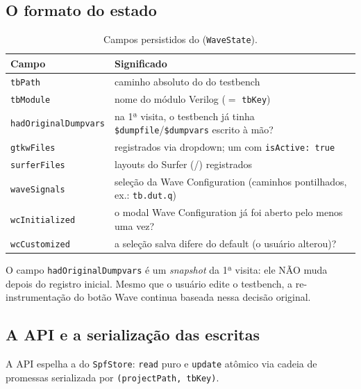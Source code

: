 \subsection{O formato do estado}

\begin{table}[h]
\centering
\begin{tabularx}{\linewidth}{Y Z}
\toprule
\textbf{Campo} & \textbf{Significado} \\
\midrule
\lstinline|tbPath| & caminho absoluto do  do testbench \\
\lstinline|tbModule| & nome do módulo Verilog ($=$ \lstinline|tbKey|) \\
\lstinline|hadOriginalDumpvars| & na 1ª visita, o testbench já tinha \lstinline|$dumpfile|/\lstinline|$dumpvars| escrito à mão? \\
\lstinline|gtkwFiles| &  registrados via dropdown; um com \lstinline|isActive: true| \\
\lstinline|surferFiles| & layouts do Surfer (/) registrados \\
\lstinline|waveSignals| & seleção da Wave Configuration (caminhos pontilhados, ex.: \lstinline|tb.dut.q|) \\
\lstinline|wcInitialized| & o modal Wave Configuration já foi aberto pelo menos uma vez? \\
\lstinline|wcCustomized| & a seleção salva difere do default (o usuário alterou)? \\
\bottomrule
\end{tabularx}
\caption{Campos persistidos do  (\lstinline|WaveState|).}
\label{tab:09-wavestore}
\end{table}

O campo \lstinline|hadOriginalDumpvars| é um \emph{snapshot} da 1ª visita: ele
NÃO muda depois do registro inicial. Mesmo que o usuário edite o testbench, a
re-instrumentação do botão Wave continua baseada nessa decisão original.

\subsection{A API e a serialização das escritas}

A API espelha a do \lstinline|SpfStore|: \lstinline|read| puro e
\lstinline|update| atômico via cadeia de promessas serializada por
\lstinline|(projectPath, tbKey)|.

